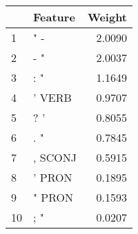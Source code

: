 \begin{tabular}{llr}
\toprule
{} &  Feature &  Weight \\
\midrule
1  &      " - &  2.0090 \\
2  &      - " &  2.0037 \\
3  &      : " &  1.1649 \\
4  &   ' VERB &  0.9707 \\
5  &      ? ' &  0.8055 \\
6  &      . " &  0.7845 \\
7  &  , SCONJ &  0.5915 \\
8  &   ' PRON &  0.1895 \\
9  &   " PRON &  0.1593 \\
10 &      ; " &  0.0207 \\
\bottomrule
\end{tabular}
